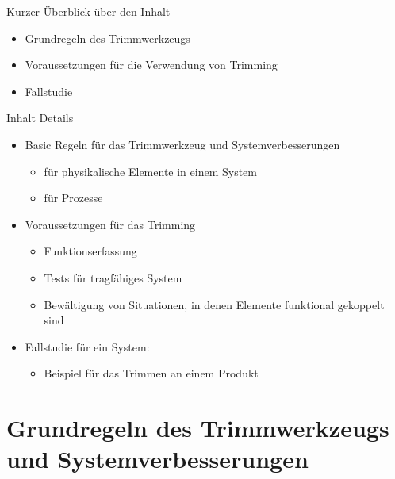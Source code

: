 \documentclass{beamer}
\begin{document}
	\begin{frame}{Kurzer Überblick über den Inhalt}
		\begin{itemize}
			\item Grundregeln des Trimmwerkzeugs
			\item Voraussetzungen für die Verwendung von Trimming
			\item Fallstudie
		\end{itemize}
	\end{frame}
	
	\begin{frame}{Inhalt Details}
		\begin{itemize}
			\item Basic Regeln für das Trimmwerkzeug und Systemverbesserungen
    		\begin{itemize}
    			\item für physikalische Elemente in einem System
    			\item für Prozesse
    		\end{itemize}
			\item Voraussetzungen für das Trimming
    		\begin{itemize}
    			\item Funktionserfassung
    			\item Tests für tragfähiges System
    			\item Bewältigung von Situationen, in denen Elemente funktional gekoppelt sind
    		\end{itemize}
			\item Fallstudie für ein System:
    		\begin{itemize}
    			\item Beispiel für das Trimmen an einem Produkt
    		\end{itemize}
		\end{itemize}
	\end{frame}
	
	\section{Grundregeln des Trimmwerkzeugs und Systemverbesserungen}
	
\end{document}
